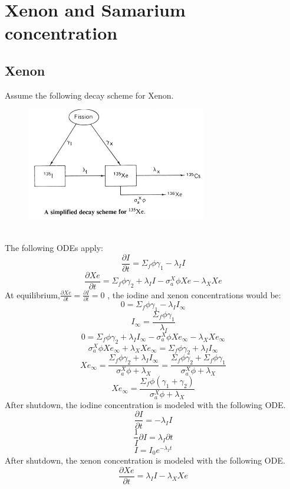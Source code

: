 \documentclass[]{article}
\begin{document}
		\section*{\textbf{Xenon and Samarium concentration}}
		\subsection*{\textbf{Xenon}}
		Assume the following decay scheme for Xenon.\\
		\begin{figure}[h!]\centering
			\includegraphics[width=0.7\textwidth]{xenon.jpg}
		\end{figure}\\
		The following ODEs apply:
		\[
		\frac{\partial I}{\partial t} = \Sigma_f \phi \gamma_1 - \lambda_I I
		\]
		\[
		\frac{\partial Xe}{\partial t} = \Sigma_f \phi \gamma_2 + \lambda_I I -\sigma_a^X \phi Xe - \lambda_X Xe
		\]
		At equilibrium,$\frac{\partial Xe}{\partial t} = \frac{\partial I}{\partial t} = 0$ , the iodine and xenon concentrations would be:
		\[
		0= \Sigma_f \phi \gamma_1 - \lambda_I I_\infty
		\]
		\[
		I_\infty= \frac{\Sigma_f \phi \gamma_1}{\lambda_I}  
		\]
		\[
		0 = \Sigma_f \phi \gamma_2 + \lambda_I I_\infty -\sigma_a^X \phi Xe_\infty - \lambda_X Xe_\infty
		\]
		\[
		\sigma_a^X \phi Xe_\infty +\lambda_X Xe_\infty = \Sigma_f \phi \gamma_2 + \lambda_I I_\infty 
		\]
		\[
		Xe_\infty= \frac{\Sigma_f \phi \gamma_2 + \lambda_I I_\infty}{\sigma_a^X \phi + \lambda_X} = \frac{\Sigma_f \phi \gamma_2 + \Sigma_f \phi \gamma_1}{\sigma_a^X \phi + \lambda_X} 
		\]
		\[
		Xe_\infty= \frac{\Sigma_f \phi (\gamma_1+\gamma_2)}{\sigma_a^X \phi + \lambda_X} 
		\]
		After shutdown, the iodine concentration is modeled with the following ODE.
		\[
		\frac{\partial I}{\partial t} = - \lambda_I I
		\]
		\[
		\frac{1}{I}\partial I =  \lambda_I \partial t
		\]
		\[
		I =  I_0 e^{-\lambda_I t}
		\]
		After shutdown, the xenon concentration is modeled with the following ODE.
		\[
		\frac{\partial Xe}{\partial t} = \lambda_I I - \lambda_X Xe
		\]
\end{document}
